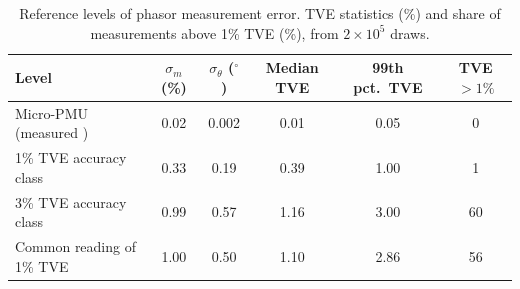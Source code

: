 \documentclass[11pt]{article}
\newcommand{\hlnew}[1]{#1}
\begin{document}
\begin{table}[!htbp]
\centering
\caption{\hlnew{Reference levels of phasor measurement error. TVE statistics (\%) and share of measurements above 1\% TVE (\%), from $2\times10^5$ draws.}}\label{tab_noise}
\small
\begin{tabular}{lccccc}
\toprule
Level & $\sigma_m$ (\%) & $\sigma_\theta$ ($^\circ$) & Median TVE & 99th pct.\ TVE & TVE $>1\%$ \\
\midrule
Micro-PMU (measured \cite{upmu}) & 0.02 & 0.002 & 0.01 & 0.05 & 0\\
1\% TVE accuracy class & 0.33 & 0.19 & 0.39 & 1.00 & 1\\
3\% TVE accuracy class & 0.99 & 0.57 & 1.16 & 3.00 & 60\\
Common reading of 1\% TVE & 1.00 & 0.50 & 1.10 & 2.86 & 56\\
\bottomrule
\end{tabular}
\end{table}
\end{document}
